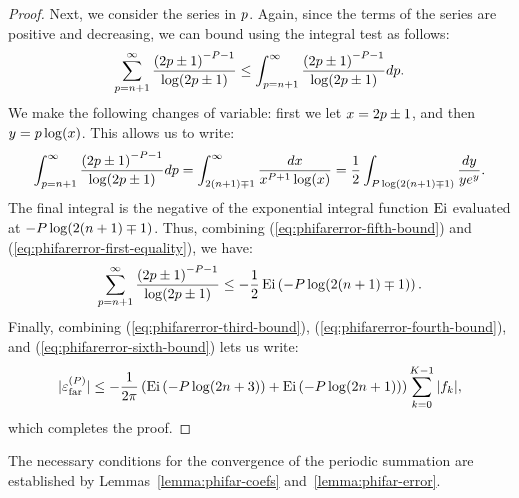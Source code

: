 \begin{proof}
  Next, we consider the series in $p$. Again, since the
  terms of the series are positive and decreasing, we can bound using
  the integral test as follows:
  \begin{align}
    \label{eq:phifarerror-fifth-bound}
    \sum_{p=n+1}^\infty \frac{{(2 p \pm 1)}^{-P-1}}{\log(2p \pm 1)} \leq \int_{p=n+1}^\infty \frac{{(2 p \pm 1)}^{-P-1}}{\log(2p \pm 1)} dp.
  \end{align}
  We make the following changes of variable: first we let
  $x = 2p\pm 1$, and then $y = p\log(x)$. This
  allows us to write:
  \begin{align}
    \label{eq:phifarerror-first-equality}
    \int_{p=n+1}^\infty \frac{{(2 p \pm 1)}^{-P-1}}{\log(2p \pm 1)} dp = \int_{2(n+1)\mp 1}^\infty \frac{dx}{x^{P+1}\log(x)} = \frac{1}{2} \int_{P \log(2(n+1)\mp 1)} \frac{dy}{ye^y}.
  \end{align}
  The final integral is the negative of the exponential integral
  function $\operatorname{Ei}$ evaluated at
  $-P \log(2(n+1)\mp 1)$. Thus, combining
  (\ref{eq:phifarerror-fifth-bound}) and
  (\ref{eq:phifarerror-first-equality}), we have:
  \begin{align}
    \label{eq:phifarerror-sixth-bound}
    \sum_{p=n+1}^\infty \frac{{(2 p \pm 1)}^{-P-1}}{\log(2p \pm 1)} \leq -\frac{1}{2} \operatorname{Ei} \left(-P \log(2(n+1)\mp 1)\right).
  \end{align}
  Finally, combining (\ref{eq:phifarerror-third-bound}),
  (\ref{eq:phifarerror-fourth-bound}), and
  (\ref{eq:phifarerror-sixth-bound}) lets us write:
  \begin{align}
    \label{eq:phifarerror-result}
    |{\varepsilon}^{(P)}_{\operatorname{far}}| \leq -\frac{1}{2\pi} \left(\operatorname{Ei} \left(-P \log(2n+3)\right) + \operatorname{Ei} \left(-P \log(2n+1)\right)\right) \sum_{{k}=0}^{K{}-1} |{f}_{k}|,
  \end{align}
  which completes the proof.
\end{proof}

\begin{theorem}
  The necessary conditions for the convergence of the periodic
  summation are established by Lemmas~\ref{lemma:phifar-coefs}
  and~\ref{lemma:phifar-error}.
\end{theorem}

